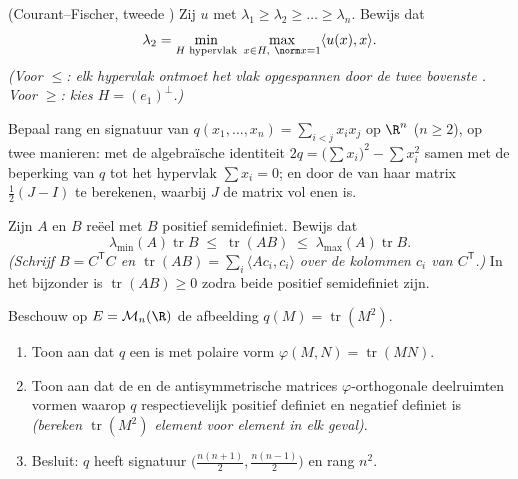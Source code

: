 \begin{exercise}[$\star\star\star$]\label{exo:b2:quadratic:9}
(Courant--Fischer, tweede ) Zij $u$  met
 $\lambda_1 \geq \lambda_2 \geq \dots \geq \lambda_n$.
Bewijs dat
\[
\lambda_2 = \min_{\substack{H \text{ hypervlak}}}\;
\max_{\substack{x \in H,\ \norm x = 1}} \langle u(x), x\rangle .
\]
\emph{(Voor $\leq$: elk hypervlak ontmoet het vlak opgespannen door
de twee bovenste . Voor $\geq$: kies $H =
(e_1)^{\perp}$.)}
\end{exercise}

\begin{exercise}[$\star\star$]\label{exo:b2:quadratic:10}
Bepaal rang en signatuur van $q(x_1, \dots, x_n) = \sum_{i < j}
x_ix_j$ op $\R^n$ ($n \geq 2$), op twee manieren: met de
algebraïsche identiteit $2q = \bigl(\sum x_i\bigr)^2 - \sum x_i^2$
samen met de beperking van $q$ tot het hypervlak $\sum x_i = 0$; en
door de  van haar matrix $\frac12(J - I)$ te berekenen,
waarbij $J$ de matrix vol enen is.
\end{exercise}

\begin{exercise}[$\star\star$]\label{exo:b2:quadratic:11}
Zijn $A$ en $B$ reëel  met $B$ positief semidefiniet.
Bewijs dat
\[
\lambda_{\min}(A)\operatorname{tr} B
\;\leq\;
\operatorname{tr}(AB)
\;\leq\;
\lambda_{\max}(A)\operatorname{tr} B .
\]
\emph{(Schrijf $B = C^{\mathsf T}C$ en $\operatorname{tr}(AB) =
\sum_i \langle A c_i, c_i\rangle$ over de kolommen $c_i$ van
$C^{\mathsf T}$.)} In het bijzonder is $\operatorname{tr}(AB) \geq
0$ zodra beide positief semidefiniet zijn.
\end{exercise}

\begin{exercise}[$\star\star\star$]\label{exo:b2:quadratic:12}
Beschouw op $E = \mathcal{M}_n(\R)$ de afbeelding $q(M) =
\operatorname{tr}(M^2)$.
\begin{enumerate}
  \item Toon aan dat $q$ een  is met polaire vorm
        $\varphi(M, N) = \operatorname{tr}(MN)$.
  \item Toon aan dat de  en de antisymmetrische
        matrices $\varphi$-orthogonale deelruimten vormen waarop
        $q$ respectievelijk positief definiet en negatief definiet
        is \emph{(bereken $\operatorname{tr}(M^2)$ element voor
        element in elk geval)}.
  \item Besluit: $q$ heeft signatuur $\bigl(\frac{n(n+1)}{2},
        \frac{n(n-1)}{2}\bigr)$ en rang $n^2$.
\end{enumerate}
\end{exercise}

